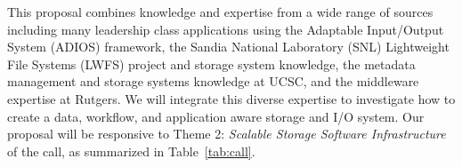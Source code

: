 This proposal combines knowledge and expertise 
from a wide range of sources including many leadership class applications using the Adaptable Input/Output System (ADIOS) framework,
the Sandia National Laboratory (SNL) Lightweight File Systems (LWFS) project and storage system knowledge, the metadata
management and storage systems knowledge at UCSC, and the middleware expertise
at Rutgers. We will integrate this diverse expertise to investigate how to create
a data, workflow, and application aware storage and I/O system.
%
Our proposal will be responsive to Theme 2: {\em Scalable Storage Software Infrastructure} of the call, as summarized in Table~\ref{tab:call}.


